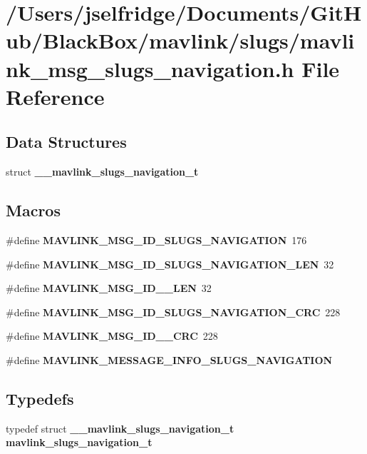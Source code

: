 \section{/\+Users/jselfridge/\+Documents/\+Git\+Hub/\+Black\+Box/mavlink/slugs/mavlink\+\_\+msg\+\_\+slugs\+\_\+navigation.h File Reference}
\label{mavlink__msg__slugs__navigation_8h}
\subsection*{Data Structures}
\begin{DoxyCompactItemize}
\item 
struct \textbf{ \+\_\+\+\_\+mavlink\+\_\+slugs\+\_\+navigation\+\_\+t}
\end{DoxyCompactItemize}
\subsection*{Macros}
\begin{DoxyCompactItemize}
\item 
\#define \textbf{ M\+A\+V\+L\+I\+N\+K\+\_\+\+M\+S\+G\+\_\+\+I\+D\+\_\+\+S\+L\+U\+G\+S\+\_\+\+N\+A\+V\+I\+G\+A\+T\+I\+ON}~176
\item 
\#define \textbf{ M\+A\+V\+L\+I\+N\+K\+\_\+\+M\+S\+G\+\_\+\+I\+D\+\_\+\+S\+L\+U\+G\+S\+\_\+\+N\+A\+V\+I\+G\+A\+T\+I\+O\+N\+\_\+\+L\+EN}~32
\item 
\#define \textbf{ M\+A\+V\+L\+I\+N\+K\+\_\+\+M\+S\+G\+\_\+\+I\+D\+\_\+\_\+\+L\+EN}~32
\item 
\#define \textbf{ M\+A\+V\+L\+I\+N\+K\+\_\+\+M\+S\+G\+\_\+\+I\+D\+\_\+\+S\+L\+U\+G\+S\+\_\+\+N\+A\+V\+I\+G\+A\+T\+I\+O\+N\+\_\+\+C\+RC}~228
\item 
\#define \textbf{ M\+A\+V\+L\+I\+N\+K\+\_\+\+M\+S\+G\+\_\+\+I\+D\+\_\+\_\+\+C\+RC}~228
\item 
\#define \textbf{ M\+A\+V\+L\+I\+N\+K\+\_\+\+M\+E\+S\+S\+A\+G\+E\+\_\+\+I\+N\+F\+O\+\_\+\+S\+L\+U\+G\+S\+\_\+\+N\+A\+V\+I\+G\+A\+T\+I\+ON}
\end{DoxyCompactItemize}
\subsection*{Typedefs}
\begin{DoxyCompactItemize}
\item 
typedef struct \textbf{ \+\_\+\+\_\+mavlink\+\_\+slugs\+\_\+navigation\+\_\+t} \textbf{ mavlink\+\_\+slugs\+\_\+navigation\+\_\+t}
\end{DoxyCompactItemize}


